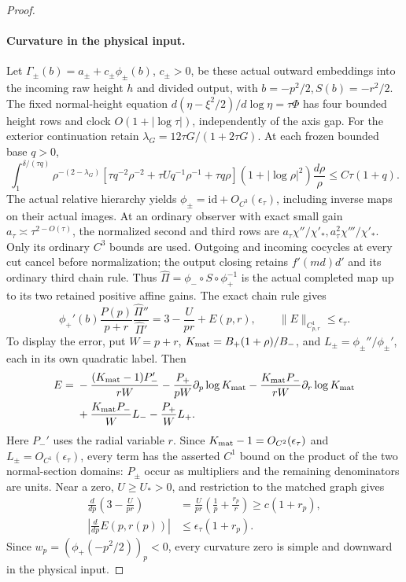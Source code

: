 \begin{proof}
\paragraph{Curvature in the physical input.}
Let \(\Gamma_\pm(b)=a_\pm+c_\pm\phi_\pm(b)\), \(c_\pm>0\), be
these actual outward embeddings into the incoming raw height \(h\)
and divided output, with \(b=-p^2/2,S(b)=-r^2/2\).
The fixed normal-height equation
\(d(\eta-\xi^2/2)/d\log\eta=\tau\Phi\) has four bounded height
rows and clock \(O(1+|\log\tau|)\), independently of the axis gap.
For the exterior continuation retain \(\lambda_G=12\tau G/(1+2\tau G)\).
At each frozen bounded base \(q>0\),
\begin{equation}\label{deg:compact-section-integral}
 \int_1^{\delta/(\tau q)}\rho^{-(2-\lambda_G)}
 [\tau q^{-2}\rho^{-2}+\tau Uq^{-1}\rho^{-1}+\tau q\rho]
 (1+|\log\rho|^2)\frac{d\rho}\rho\le C\tau(1+q).
\end{equation}
The actual relative hierarchy yields
\(\phi_\pm=\mathrm{id}+O_{C^3}(\epsilon_\tau)\), including inverse
maps on their actual images. At an ordinary observer with exact small
gain \(a_\tau\asymp\tau^{2-O(\tau)}\), the normalized second and
third rows are \(a_\tau\chi''/\chi'_*,a_\tau^2\chi'''/\chi'_*\).
Only its ordinary \(C^3\) bounds are used. Outgoing and incoming
cocycles at every cut cancel before normalization; the output closing
retains \(f'(md)d'\) and its ordinary third chain rule.
Thus \(\widehat\Pi=\phi_-\circ S\circ\phi_+^{-1}\) is the actual
completed map up to its two retained positive affine gains.
The exact chain rule gives
\begin{equation}\label{deg:compact-finite-curvature}
 \phi_+'(b)\frac{P(p)}{p+r}\frac{\widehat\Pi''}{\widehat\Pi'}
 =3-\frac U{pr}+E(p,r),\qquad\|E\|_{C^1_{p,r}}\le\epsilon_\tau.
\end{equation}
To display the error, put \(W=p+r\),
\(K_{\rm mat}=B_+(1+\rho)/B_-\), and
\(L_\pm=\phi_\pm''/\phi_\pm'\), each in its own quadratic label.
Then
\[
 \begin{aligned}
 E={}&-\frac{(K_{\rm mat}-1)P_-'}{rW}
       -\frac{P_+}{pW}\partial_p\log K_{\rm mat}
       -\frac{K_{\rm mat}P_-}{rW}\partial_r\log K_{\rm mat}\\
    &+\frac{K_{\rm mat}P_-}{W}L_-
       -\frac{P_+}{W}L_+ .
 \end{aligned}
\]
Here \(P_-'\) uses the radial variable \(r\).
Since \(K_{\rm mat}-1=O_{C^2}(\epsilon_\tau)\) and
\(L_\pm=O_{C^1}(\epsilon_\tau)\), every term has the asserted
\(C^1\) bound on the product of the two normal-section domains:
\(P_\pm\) occur as multipliers and the remaining denominators are units.
Near a zero, \(U\ge U_*>0\), and restriction to the matched graph gives
\[
 \begin{aligned}
 \frac d{dp}\left(3-\frac U{pr}\right)
 &=\frac U{pr}\left(\frac1p+\frac{r_p}{r}\right)
 \ge c(1+r_p),\\
 \left|\frac d{dp}E(p,r(p))\right|
 &\le\epsilon_\tau(1+r_p).
 \end{aligned}
\]
Since \(w_p=(\phi_+(-p^2/2))_p<0\), every curvature zero is
simple and downward in the physical input.


\end{proof}
